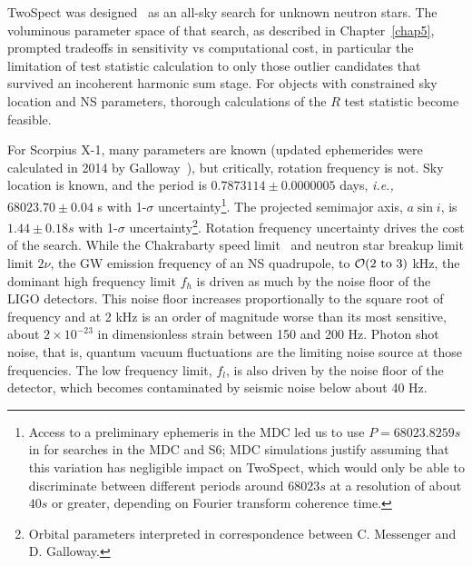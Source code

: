 TwoSpect was designed~\cite{GoetzThesis,GoetzTwoSpectMethods2011} as an all-sky search for unknown neutron stars.
The voluminous parameter space of that search, as described in Chapter~\ref{chap5}, prompted tradeoffs in sensitivity vs computational cost, in particular the limitation of test statistic calculation to only those outlier candidates that survived an incoherent harmonic sum stage. 
For objects with constrained sky location and NS parameters, thorough calculations of the $R$ test statistic become feasible.

For Scorpius X-1, many parameters are known (updated ephemerides were calculated in 2014 by Galloway~\cite{Galloway2014}), but critically, rotation frequency is not.
Sky location is known, and the period is $0.7873114 \pm 0.0000005$ days, \textit{i.e.,} $68023.70 \pm 0.04$ s with 1-$\sigma$ uncertainty\footnote{Access to a preliminary ephemeris in the MDC led us to use $P = 68023.8259 s$ in for searches in the MDC and S6; MDC simulations justify assuming that this variation has negligible impact on TwoSpect, which would only be able to discriminate between different periods around $68023 s$ at a resolution of about $40 s$ or greater, depending on Fourier transform coherence time.}.
The projected semimajor axis, $a \sin i$, is $1.44 \pm 0.18 s$ with 1-$\sigma$ uncertainty\footnote{Orbital parameters interpreted in correspondence between C. Messenger and D. Galloway.}.
Rotation frequency uncertainty drives the cost of the search.
While the Chakrabarty speed limit~\cite{Chakrabarty2003} and neutron star breakup limit limit $2\nu$, the GW emission frequency of an NS quadrupole, to $\mathcal{O}(2\textup{ to }3)$ kHz, the dominant high frequency limit $f_h$ is driven as much by the noise floor of the LIGO detectors.
This noise floor increases proportionally to the square root of frequency and at 2 kHz is an order of magnitude worse than its most sensitive, about $2\times10^{-23}$ in dimensionless strain between 150 and 200 Hz.
Photon shot noise, that is, quantum vacuum fluctuations are the limiting noise source at those frequencies.
The low frequency limit, $f_l$, is also driven by the noise floor of the detector, which becomes contaminated by seismic noise below about 40 Hz.

